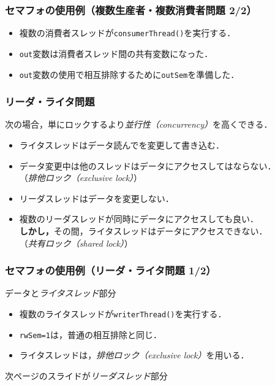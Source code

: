 \documentclass[unicode,handout]{beamer}                   %
\begin{document}
\begin{frame}
  \frametitle{セマフォの使用例（複数生産者・複数消費者問題 2/2）}
  \begin{itemize}
  \item 複数の消費者スレッドが\texttt{consumerThread()}を実行する．
  \item \texttt{out}変数は消費者スレッド間の共有変数になった．
  \item \texttt{out}変数の使用で相互排除するために\texttt{outSem}を準備した．
  \end{itemize}
  \vfill
\end{frame}

\begin{frame}
  \frametitle{リーダ・ライタ問題}
  次の場合，単にロックするより\emph{並行性（concurrency）}を高くできる．
  \vfill
  \begin{itemize}
  \item ライタスレッドはデータ読んでを変更して書き込む．
  \item データ変更中は他のスレッドはデータにアクセスしてはならない．\\
    （\emph{排他ロック（exclusive lock）}）
      \vfill
  \item リーダスレッドはデータを変更しない．
  \item 複数のリーダスレッドが同時にデータにアクセスしても良い．\\
    \textbf{しかし，}その間，ライタスレッドはデータにアクセスできない．\\
    （\emph{共有ロック（shared lock）}）
  \end{itemize}
  \vfill
\end{frame}

\begin{frame}
  \frametitle{セマフォの使用例（リーダ・ライタ問題 1/2）}
  データと\emph{ライタスレッド}部分
  \vfill
  \vfill
  \begin{itemize}
  \item 複数のライタスレッドが\texttt{writerThread()}を実行する．
  \item \texttt{rwSem=1}は，普通の相互排除と同じ．
  \item ライタスレッドは，\emph{排他ロック（exclusive lock）}を用いる．
  \end{itemize}
  \vfill
  次ページのスライドが\emph{リーダスレッド}部分
  \vfill
\end{frame}
\end{document}

